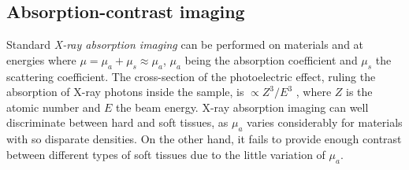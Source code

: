 {\subsection{Absorption-contrast imaging}
Standard \emph{X-ray absorption imaging} can be performed on materials and at energies where $\mu = \mu_{a} + \mu_{s} \approx \mu_{a}$, 
$\mu_{a}$ being the absorption coefficient and $\mu_{s}$ the scattering coefficient.
The cross-section of the photoelectric effect, ruling the absorption of X-ray photons inside the sample, is $\propto Z^{3}/E^{3}$ \cite{WikiPhoto},
where $Z$ is the atomic number and $E$ the beam energy.
X-ray absorption imaging can well discriminate between hard and soft tissues, as $\mu_{a}$ varies considerably
for materials with so disparate densities. On the other hand, it fails to provide enough contrast between different types
of soft tissues due to the little variation of $\mu_{a}$.

}
